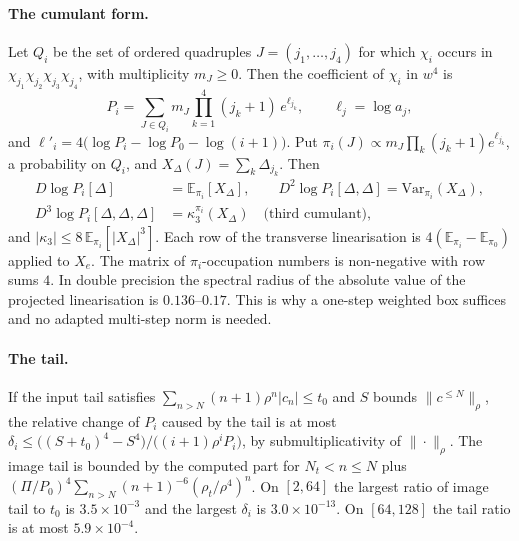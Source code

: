 \documentclass[11pt,a4paper]{article}
\theoremstyle{definition}
\theoremstyle{remark}
\begin{document}
\paragraph{The cumulant form.}
Let $Q_i$ be the set of ordered quadruples $J=(j_1,\dots,j_4)$ for which $\chi_i$ occurs in $\chi_{j_1}\chi_{j_2}\chi_{j_3}\chi_{j_4}$, with multiplicity $m_J\ge0$.
Then the coefficient of $\chi_i$ in $w^4$ is
\[
P_i=\sum_{J\in Q_i}m_J\prod_{k=1}^4(j_k+1)\,e^{\ell_{j_k}},\qquad \ell_j=\log a_j,
\]
and $\ell'_i=4\bigl(\log P_i-\log P_0-\log(i+1)\bigr)$.
Put $\pi_i(J)\propto m_J\prod_k(j_k+1)e^{\ell_{j_k}}$, a probability on $Q_i$, and $X_\Delta(J)=\sum_k\Delta_{j_k}$.
Then
\begin{align*}
D\log P_i[\Delta]&=\mathbb{E}_{\pi_i}[X_\Delta],\qquad D^2\log P_i[\Delta,\Delta]=\mathrm{Var}_{\pi_i}(X_\Delta),\\
D^3\log P_i[\Delta,\Delta,\Delta]&=\kappa_3^{\pi_i}(X_\Delta)\quad\text{(third cumulant)},
\end{align*}
and $|\kappa_3|\le8\,\mathbb{E}_{\pi_i}[|X_\Delta|^3]$.
Each row of the transverse linearisation is $4(\mathbb{E}_{\pi_i}-\mathbb{E}_{\pi_0})$ applied to $X_e$.
The matrix of $\pi_i$-occupation numbers is non-negative with row sums $4$.
In double precision the spectral radius of the absolute value of the projected linearisation is $0.136$--$0.17$.
This is why a one-step weighted box suffices and no adapted multi-step norm is needed.

\paragraph{The tail.}
If the input tail satisfies $\sum_{n>N}(n+1)\rho^n|c_n|\le t_0$ and $S$ bounds $\|c^{\le N}\|_\rho$, the relative change of $P_i$ caused by the tail is at most $\delta_i\le\bigl((S+t_0)^4-S^4\bigr)/\bigl((i+1)\rho^iP_i\bigr)$, by submultiplicativity of $\|\cdot\|_\rho$.
The image tail is bounded by the computed part for $N_t<n\le N$ plus $(\Pi/P_0)^4\sum_{n>N}(n+1)^{-6}(\rho_t/\rho^4)^n$.
On $[2,64]$ the largest ratio of image tail to $t_0$ is $3.5\times10^{-3}$ and the largest $\delta_i$ is $3.0\times10^{-13}$.
On $[64,128]$ the tail ratio is at most $5.9\times10^{-4}$.
\end{document}
